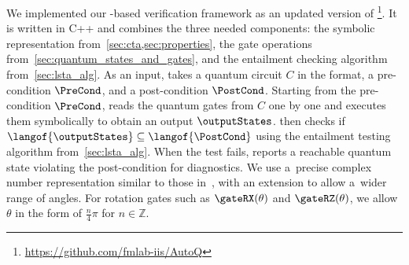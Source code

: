 We implemented our \lsta-based verification framework as an updated version of \tool \footnote{\url{https://github.com/fmlab-iis/AutoQ}}. 
It is written in C++ and combines the three needed components:
the \lsta symbolic representation from~\cref{sec:cta,sec:properties}, the gate operations from~\cref{sec:quantum_states_and_gates}, and the entailment checking algorithm from~\cref{sec:lsta_alg}. 
As an input, \tool takes a quantum circuit $C$ in the \qasm format, a pre-condition \lsta $\PreCond$, and a post-condition \lsta $\PostCond$. Starting from the pre-condition \lsta $\PreCond$, \tool reads the quantum gates from $C$ one by one and executes them symbolically to obtain an output \lsta $\outputStates$. \tool then checks if $\langof{\outputStates} \subseteq \langof{\PostCond}$ using the entailment testing algorithm from~\cref{sec:lsta_alg}. When the test fails, \tool reports a reachable quantum state violating the post-condition for diagnostics.
We use a~precise complex number representation similar to those
in~\cite{TsaiJJ21,ZulehnerW19,ChenCLLTY23}, with an extension to allow a~wider
range of angles.
For rotation gates such as $\gateRX(\theta)$ and $\gateRZ(\theta)$, we allow $\theta$ in the form of $\frac{n}{4}\pi$ for $n\in \mathbb{Z}$.

